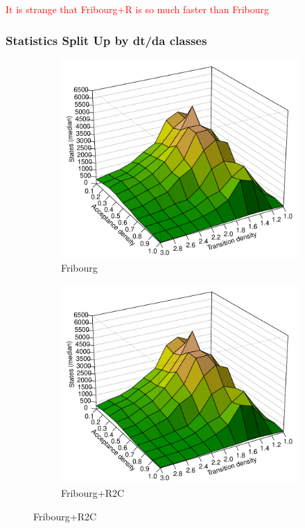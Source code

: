 \textcolor{red}{It is strange that Fribourg+R is so much faster than Fribourg}

\subsubsection{Statistics Split Up by dt/da classes}

\newcommand{\perspwidth}{0.475}

\begin{figure}[ht]
\centering
  \hfill
  \begin{subfigure}[t]{\perspwidth\textwidth}
  \centering
  \includegraphics[width=\textwidth]{figures/r/internal/goal/s.median.Fribourg.pdf}
  \caption{Fribourg}
  \end{subfigure}
  \hfill
  \begin{subfigure}[t]{\perspwidth\textwidth}
  \centering
  \includegraphics[width=\textwidth]{figures/r/internal/goal/s.median.Fribourg+R2C.pdf}
  \caption{Fribourg+R2C}
  \end{subfigure}
  \hfill


\end{figure}
